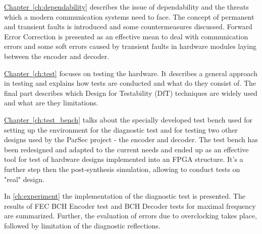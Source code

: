 \hyperref[ch:dependability]{Chapter~\ref*{ch:dependability}} describes the issue of dependability and the threats which a modern communication systems need to face. The concept of permanent and transient faults is introduced and some countermeasures discussed. Forward Error Correction is presented as an effective mean to deal with communication errors and some soft errors caused by transient faults in hardware modules laying between the encoder and decoder.

\hyperref[ch:test]{Chapter~\ref*{ch:test}} focuses on testing the hardware. It describes a general approach in testing and explains how tests are conducted and what do they consist of. The final part describes which Design for Testability (DfT) techniques are widely used and what are they limitations.

\hyperref[ch:test_bench]{Chapter~\ref*{ch:test_bench}} talks about the specially developed test bench used for setting up the environment for the diagnostic test and for testing two other designs used by the ParSec project - the encoder and decoder. The test bench has been redesigned and adapted to the current needs and ended up as an effective tool for test of hardware designs implemented into an FPGA structure. It's a further step then the post-synthesis simulation, allowing to conduct tests on "real" design.

In \autoref{ch:experiment} the implementation of the diagnostic test is presented. The results of FEC BCH Encoder test and BCH Decoder tests for maximal frequency are summarized. Further, the evaluation of errors due to overclocking takes place, followed by limitation of the diagnostic reflections.




